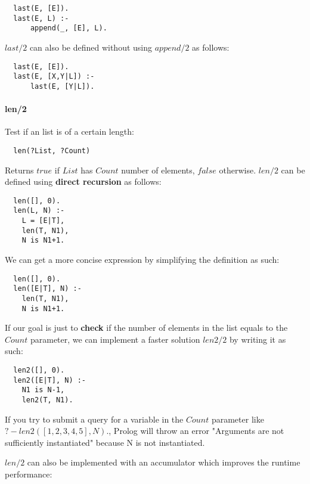 \documentclass{article}
\begin{document}
\begin{multicols}{2}
  \begin{lstlisting}
  last(E, [E]).
  last(E, L) :-
      append(_, [E], L).
  \end{lstlisting} 
  
  $last/2$ can also be defined without using $append/2$ as follows:  
  
  \begin{lstlisting}
  last(E, [E]).
  last(E, [X,Y|L]) :-
      last(E, [Y|L]).
  \end{lstlisting} 
  
  \paragraph{len/2} Test if an list is of a certain length:
  
  \begin{lstlisting}
  len(?List, ?Count)
  \end{lstlisting} 
  
  Returns $true$ if $List$ has $Count$ number of elements, $false$ otherwise. $len/2$ can be defined using {\bf direct recursion} as follows:
  
  \begin{lstlisting}
  len([], 0).
  len(L, N) :-
	L = [E|T],
	len(T, N1),
	N is N1+1.
  \end{lstlisting} 
  
  We can get a more concise expression by simplifying the definition as such:  
  
  \begin{lstlisting}
  len([], 0).
  len([E|T], N) :-
	len(T, N1),
	N is N1+1.
  \end{lstlisting} 

  If our goal is just to {\bf check} if the number of elements in the list equals to the $Count$ parameter, we can implement a faster solution $len2/2$ by writing it as such:
  
  \begin{lstlisting} 
  len2([], 0).
  len2([E|T], N) :-
    N1 is N-1,
  	len2(T, N1).
  \end{lstlisting}
  
  If you try to submit a query for a variable in the $Count$ parameter like $?- len2([1, 2, 3, 4, 5], N).$, Prolog will throw an error "Arguments are not sufficiently instantiated" because N is not instantiated.
  
  $len/2$ can also be implemented with an accumulator which improves the runtime performance:
  

\end{multicols}
\end{document}
